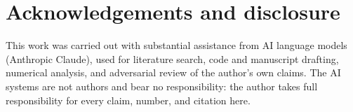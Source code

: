 \section*{Acknowledgements and disclosure}

This work was carried out with substantial assistance from AI language
models (Anthropic Claude), used for literature search, code and
manuscript drafting, numerical analysis, and adversarial review of the
author's own claims. The AI systems are not authors and bear no
responsibility: the author takes full responsibility for every claim,
number, and citation here.

